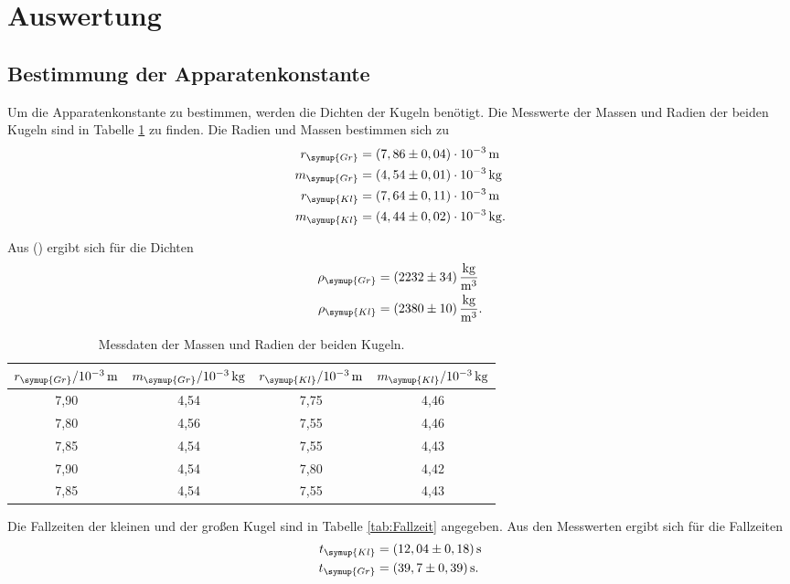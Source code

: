 \section{Auswertung}
\label{sec:Auswertung}

\subsection{Bestimmung der Apparatenkonstante}
\label{sec:Apparatenkonstante}
Um die Apparatenkonstante zu bestimmen, werden die Dichten der Kugeln benötigt.
Die Messwerte der Massen und Radien der beiden Kugeln sind in Tabelle \ref{tab:MasseundDichte} zu finden.
Die Radien und Massen bestimmen sich zu
\begin{align*}
  r_{\symup{Gr}} &= (7,86 \pm 0,04)\cdot 10^{-3} \,\si{\meter}\\
  m_{\symup{Gr}} &= (4,54 \pm 0,01) \cdot 10^{-3} \,\si{\kilo\gram}\\
  r_{\symup{Kl}} &= (7,64 \pm 0,11)\cdot 10^{-3} \,\si{\meter}\\
  m_{\symup{Kl}} &= (4,44 \pm 0,02) \cdot 10^{-3} \,\si{\kilo\gram}.\\
\end{align*}

Aus () ergibt sich für die Dichten
\begin{align*}
  \rho_{\symup{Gr}} &= (2232 \pm 34) \,\frac{\si{\kg}}{\si{m^3}}  \\
  \rho_{\symup{Kl}} &= (2380 \pm 10) \,\frac{\si{\kg}}{\si{m^3}}. \\
\end{align*}

\begin{table}
  \centering
  \caption{Messdaten der Massen und Radien der beiden Kugeln.}
  \label{tab:MasseundDichte}
  \begin{tabular}{c c c c}
    \toprule
    $r_{\symup{Gr}}/10^{-3}\,\unit{\meter}$ & $m_{\symup{Gr}}/10^{-3}\,\unit{\kilo\gram}$ & $r_{\symup{Kl}}/10^{-3}\,\unit{\meter}$ & $m_{\symup{Kl}}/10^{-3}\,\unit{\kilo\gram}$ \\
    \midrule
    7,90 & 4,54 & 7,75 & 4,46 \\
    7,80 & 4,56 & 7,55 & 4,46 \\
    7,85 & 4,54 & 7,55 & 4,43 \\
    7,90 & 4,54 & 7,80 & 4,42 \\
    7,85 & 4,54 & 7,55 & 4,43 \\
    \bottomrule
  \end{tabular}
\end{table}
Die Fallzeiten der kleinen und der großen Kugel sind in Tabelle \ref{tab:Fallzeit} angegeben. Aus den Messwerten ergibt sich für die Fallzeiten
\begin{align*}
  t_{\symup{Kl}} &= (12,04 \pm 0,18)\,\unit{\second} \\
  t_{\symup{Gr}} &= (39,7 \pm 0,39)\,\unit{\second}. \\
\end{align*}

